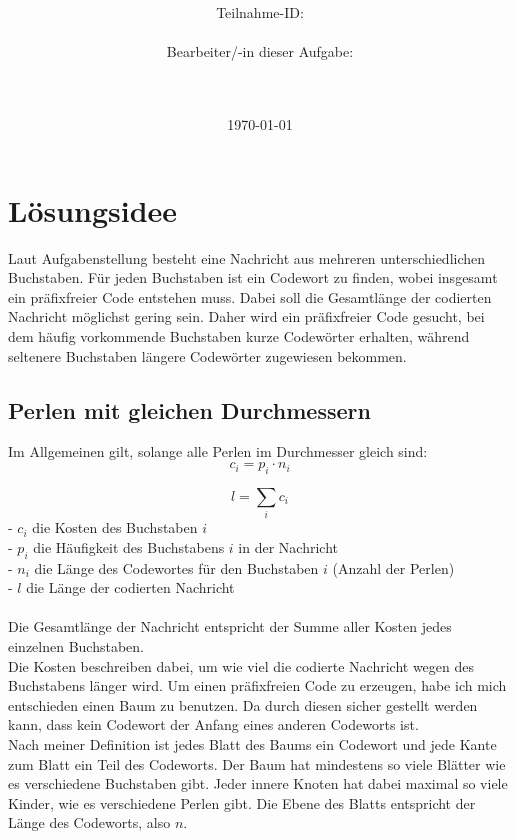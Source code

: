 \documentclass[a4paper,10pt,ngerman]{scrartcl}
\title{\textbf{\Huge\Aufgabe}}
\author{\LARGE Teilnahme-ID: \LARGE \TeilnahmeId \\\\
	    \LARGE Bearbeiter/-in dieser Aufgabe: \\ 
	    \LARGE \Name\\\\}
\date{\LARGE\today}
\begin{document}
\maketitle
\tableofcontents

\vspace{0.5cm}

\clearpage
\section{Lösungsidee}
Laut Aufgabenstellung besteht eine Nachricht aus mehreren unterschiedlichen Buchstaben. 
Für jeden Buchstaben ist ein Codewort zu finden, wobei insgesamt ein präfixfreier Code entstehen muss.
Dabei soll die Gesamtlänge der codierten Nachricht möglichst gering sein.
Daher wird ein präfixfreier Code gesucht, bei dem häufig vorkommende Buchstaben kurze Codewörter erhalten, während seltenere Buchstaben längere Codewörter zugewiesen bekommen. 
\subsection{Perlen mit gleichen Durchmessern}
Im Allgemeinen gilt, solange alle Perlen im Durchmesser gleich sind:
\begin{equation}
  \label{Kosten eines Buchstaben}
  c_i = p_i \cdot n_i
\end{equation}

\begin{equation}
  \label{equation:simple_kostenberechnung}
  l = \sum_i c_i
\end{equation}
- $c_i$ die Kosten des Buchstaben $i$ \\
- \( p_i \) die Häufigkeit des Buchstabens \( i \) in der Nachricht   \\
- \( n_i \) die Länge des Codewortes für den Buchstaben \( i \) (Anzahl der Perlen)  \\
- \( l \) die Länge der codierten Nachricht \\ 
\\
Die Gesamtlänge der Nachricht entspricht der Summe aller Kosten jedes einzelnen Buchstaben.\\
Die Kosten beschreiben dabei, um wie viel die codierte Nachricht wegen des Buchstabens länger wird.
Um einen präfixfreien Code zu erzeugen, habe ich mich entschieden einen Baum zu benutzen.
Da durch diesen sicher gestellt werden kann, dass kein Codewort der Anfang eines anderen Codeworts ist.
\\
Nach meiner Definition ist jedes Blatt des Baums ein Codewort und jede Kante zum Blatt ein Teil des Codeworts. 
Der Baum hat mindestens so viele Blätter wie es verschiedene Buchstaben gibt.
Jeder innere Knoten hat dabei maximal so viele Kinder, wie es verschiedene Perlen gibt. 
Die Ebene des Blatts entspricht der Länge des Codeworts, also $n$.
\end{document}
